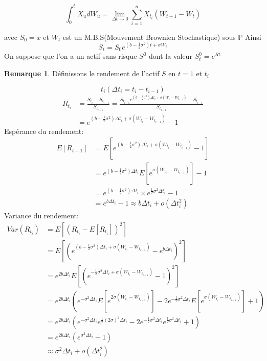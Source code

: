 \documentclass{article}
\theoremstyle{plain}
\theoremstyle{definition}
\newtheorem{remq}[thm]{Remarque}
\begin{document}
\begin{equation}
\int_0^t X_u dW_u=\lim_{\Delta t\rightarrow 0}\sum_{i=1}^{n}X_{t_i}(W_{t+1}-W_t)
\end{equation}

avec $S_0=x$ et $W_t$ est un M.B.S(Mouvement Brownien Stochastique) sous $\mathbb{P}$
Ainsi
\begin{equation}
S_t=S_0e^{(b-\frac{1}{2}\sigma^2)t+\sigma W_t}
\end{equation}
On suppose que l'on a un actif sans risque $S^0$ dont la valeur $S_t^0=e^{Rt}$
\begin{remq}
	D\'efinissons le rendement de l'actif $S$ en $t=1$ et $t_i$
\end{remq}
\begin{equation}
t_i(\Delta t_i=t_i-t_{i-1})
\end{equation}
\begin{equation}
\begin{split}
R_{t_i}&=\frac{S_{t_i}-S_{t_{i-1}}}{S_{t_{i-1}}}=\frac{S_{t_{i-1}}e^{(b-\frac{1}{2}\sigma^2)\Delta t_i+\sigma(W_{t_i}-W_{t_{i-1}})}-S_{t_{i-1}}}{S_{t_{i-1}}}\\
&=e^{(b-\frac{1}{2}\sigma^2)\Delta t_i+\sigma(W_{t_i}-W_{t_{i-1}})}-1
\end{split}
\end{equation}
Esp\'erance du rendement:
\begin{equation}
\begin{split}
E[R_{t-1}]&=E[e^{(b-\frac{1}{2}\sigma^2)\Delta t_i+\sigma(W_{t_i}-W_{t_{i-1}})}-1]\\
&=e^{(b-\frac{1}{2}\sigma^2)\Delta t_i} E[e^{\sigma(W_{t_i}-W_{t_{i-1}})}]-1\\
&=e^{(b-\frac{1}{2}\sigma^2)\Delta t_i}\times e^{\frac{1}{2}\sigma^2\Delta t_i}-1\\
&=e^{b\Delta t_i}-1\approx b\Delta t_i+o(\Delta t_i^2)
\end{split}
\end{equation}
Variance du rendement:
\begin{equation}
\begin{split}
Var(R_{t_i})&=E[(R_{t_i}-E[R_{t_i}])^2]\\
&=E[(e^{(b-\frac{1}{2}\sigma^2)\Delta t_i+\sigma(W_{t_i}-W_{t_{i-1}})}-e^{b\Delta t_i})^2]\\
&=e^{2b\Delta t_i}E[(e^{-\frac{1}{2}\sigma^2\Delta t_i+\sigma(W_{t_i}-W_{t_{i-1}})}-1)^2]\\
&=e^{2b\Delta t_i}(e^{-\sigma^2\Delta t_i}E[e^{2\sigma (W_{t_i}-W_{t_{i-1}})}]-2e^{-\frac{1}{2}\sigma^2\Delta t_i}E[e^{\sigma (W_{t_i}-W_{t_{i-1}})}]+1)\\
&=e^{2b\Delta t_i}(e^{-\sigma^2\Delta t_i} e^{\frac{1}{2}(2\sigma)^2\Delta t_i}-2e^{-\frac{1}{2}\sigma^2\Delta t_i}e^{\frac{1}{2}\sigma^2\Delta t_i}+1)\\
&=e^{2b\Delta t_i}(e^{\sigma^2\Delta t_i}-1)\\
&\approx\sigma^2\Delta t_i+o(\Delta t_i^2)
\end{split}
\end{equation}
\end{document}
